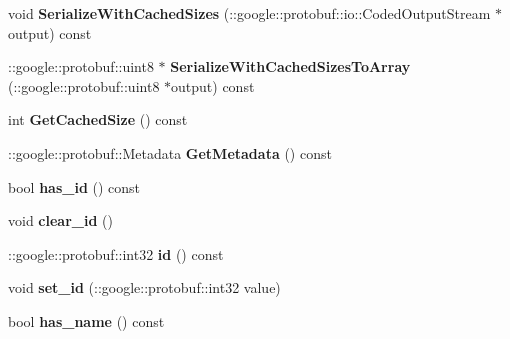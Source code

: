 \begin{DoxyCompactItemize}
\item 
\hypertarget{classSimpleChat_1_1User_af2d83f1ae710a5641e6cc163c81c0a3e}{void {\bfseries Serialize\-With\-Cached\-Sizes} (\-::google\-::protobuf\-::io\-::\-Coded\-Output\-Stream $\ast$output) const }\label{classSimpleChat_1_1User_af2d83f1ae710a5641e6cc163c81c0a3e}

\item 
\hypertarget{classSimpleChat_1_1User_a3cc508253897c0ea00a617065d24b9a4}{\-::google\-::protobuf\-::uint8 $\ast$ {\bfseries Serialize\-With\-Cached\-Sizes\-To\-Array} (\-::google\-::protobuf\-::uint8 $\ast$output) const }\label{classSimpleChat_1_1User_a3cc508253897c0ea00a617065d24b9a4}

\item 
\hypertarget{classSimpleChat_1_1User_abf5060695e86b14ca602e7453fc95360}{int {\bfseries Get\-Cached\-Size} () const }\label{classSimpleChat_1_1User_abf5060695e86b14ca602e7453fc95360}

\item 
\hypertarget{classSimpleChat_1_1User_a56cdcadf584c69e52f1bb8913b067940}{\-::google\-::protobuf\-::\-Metadata {\bfseries Get\-Metadata} () const }\label{classSimpleChat_1_1User_a56cdcadf584c69e52f1bb8913b067940}

\item 
\hypertarget{classSimpleChat_1_1User_ae369bb25f05d002d445fc7d244d78841}{bool {\bfseries has\-\_\-id} () const }\label{classSimpleChat_1_1User_ae369bb25f05d002d445fc7d244d78841}

\item 
\hypertarget{classSimpleChat_1_1User_ac7977c56651293b1efd5bbea639a45ce}{void {\bfseries clear\-\_\-id} ()}\label{classSimpleChat_1_1User_ac7977c56651293b1efd5bbea639a45ce}

\item 
\hypertarget{classSimpleChat_1_1User_aebeb2f5336d6a553e090dd0e3cbfcbab}{\-::google\-::protobuf\-::int32 {\bfseries id} () const }\label{classSimpleChat_1_1User_aebeb2f5336d6a553e090dd0e3cbfcbab}

\item 
\hypertarget{classSimpleChat_1_1User_a42e7249ccc18c7d421a00c4560c7d6e3}{void {\bfseries set\-\_\-id} (\-::google\-::protobuf\-::int32 value)}\label{classSimpleChat_1_1User_a42e7249ccc18c7d421a00c4560c7d6e3}

\item 
\hypertarget{classSimpleChat_1_1User_a4fa8407eb36f302de9afeb58670202c0}{bool {\bfseries has\-\_\-name} () const }\label{classSimpleChat_1_1User_a4fa8407eb36f302de9afeb58670202c0}


\end{DoxyCompactItemize}
